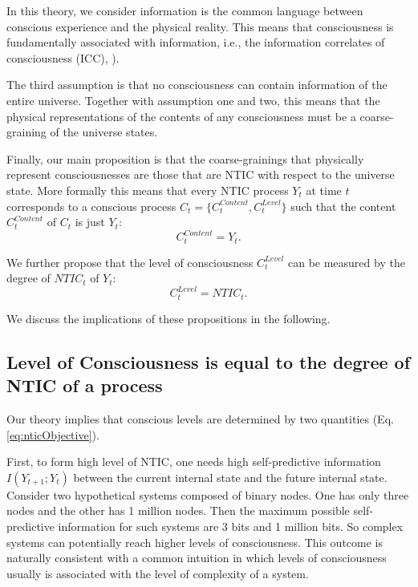 \documentclass[utf8]{article}
\begin{document}
        In this theory, we consider information is the common language between conscious experience and the physical reality. This means that consciousness is fundamentally associated with information, i.e., the information correlates of consciousness (ICC), \cite{chalmers1996conscious, tononi2004information, gamez2011information, Gamez2016}).
        
        The third assumption is that no consciousness can contain information of the entire universe. Together with assumption one and two, this means that the physical representations of the contents of any consciousness must be a coarse-graining of the universe states. 
        
        Finally, our main proposition is that the coarse-grainings that physically represent consciousnesses are those that are NTIC with respect to the universe state. More formally this means that every NTIC process $Y_t$ at time $t$ corresponds to a conscious process $C_t=\{C_t^{Content},C_t^{Level}\}$ such that the content $C_{t}^{Content}$ of $C_t$ is just $Y_t$:
		\begin{equation}\label{eq:cContent}
			C_{t}^{Content} = Y_{t}.
		\end{equation}
		
		
		\noindent
        We further propose that the level of consciousness $C_{t}^{Level}$ can be measured by the degree of $NTIC_{t}$ of $Y_t$:
		\begin{equation}\label{eq:cLevel}
			C_{t}^{Level} = NTIC_{t}.
		\end{equation}
		\newline

		
		We discuss the implications of these propositions in the following. 	
		
		
	    \subsection{Level of Consciousness is equal to the degree of NTIC of a process}
	    
	    Our theory implies that conscious levels are determined by two quantities (Eq. \ref{eq:nticObjective}). 
	    
	    First, to form high level of NTIC, one needs high self-predictive information $I(Y_{t+1};Y_{t})$ between the current internal state and the future internal state. 
	    Consider two hypothetical systems composed of binary nodes. One has only three nodes and the other has 1 million nodes. Then the maximum possible self-predictive information for such systems are 3 bits and 1 million bits. So complex systems can potentially reach higher levels of consciousness.
	    This outcome is naturally consistent with a common intuition in which levels of consciousness usually is associated with the level of complexity of a system.
\end{document}
